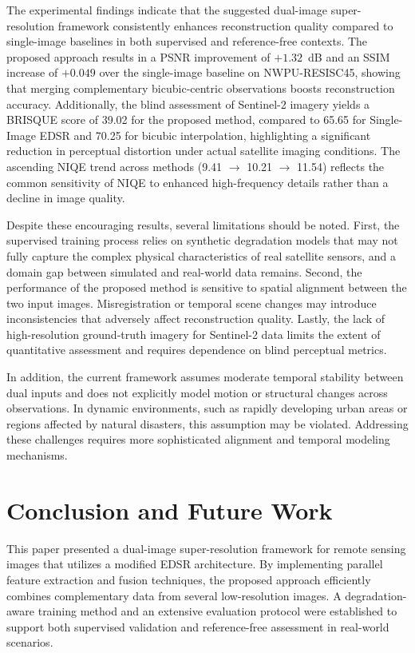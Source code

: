 \documentclass[conference]{IEEEtran}
\begin{document}
The experimental findings indicate that the suggested dual-image super-resolution framework consistently enhances reconstruction quality compared to single-image baselines in both supervised and reference-free contexts. The proposed approach results in a PSNR improvement of $+1.32$~dB and an SSIM increase of $+0.049$ over the single-image baseline on NWPU-RESISC45, showing that merging complementary bicubic-centric observations boosts reconstruction accuracy. Additionally, the blind assessment of Sentinel-2 imagery yields a BRISQUE score of 39.02 for the proposed method, compared to 65.65 for Single-Image EDSR and 70.25 for bicubic interpolation, highlighting a significant reduction in perceptual distortion under actual satellite imaging conditions. The ascending NIQE trend across methods (9.41 $\rightarrow$ 10.21 $\rightarrow$ 11.54) reflects the common sensitivity of NIQE to enhanced high-frequency details rather than a decline in image quality.

Despite these encouraging results, several limitations should be noted. First, the supervised training process relies on synthetic degradation models that may not fully capture the complex physical characteristics of real satellite sensors, and a domain gap between simulated and real-world data remains. Second, the performance of the proposed method is sensitive to spatial alignment between the two input images. Misregistration or temporal scene changes may introduce inconsistencies that adversely affect reconstruction quality. Lastly, the lack of high-resolution ground-truth imagery for Sentinel-2 data limits the extent of quantitative assessment and requires dependence on blind perceptual metrics.

In addition, the current framework assumes moderate temporal stability between dual inputs and does not explicitly model motion or structural changes across observations. In dynamic environments, such as rapidly developing urban areas or regions affected by natural disasters, this assumption may be violated. Addressing these challenges requires more sophisticated alignment and temporal modeling mechanisms.


\section{Conclusion and Future Work}

This paper presented a dual-image super-resolution framework for remote sensing images that utilizes a modified EDSR architecture. By implementing parallel feature extraction and fusion techniques, the proposed approach efficiently combines complementary data from several low-resolution images. A degradation-aware training method and an extensive evaluation protocol were established to support both supervised validation and reference-free assessment in real-world scenarios.
\end{document}
